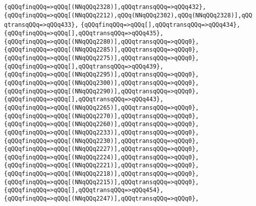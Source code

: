 \verb|{qQQqfinqQQq=>qQQq[(NNqQQq2328)],qQQqtransqQQq=>qQQq432},|\newline
\verb|{qQQqfinqQQq=>qQQq[(NNqQQq2212),qQQq(NNqQQq2302),qQQq(NNqQQq2328)],qQQqtransqQQq=>qQQq433},|\newline
\verb|{qQQqfinqQQq=>qQQq[],qQQqtransqQQq=>qQQq434},|\newline
\verb|{qQQqfinqQQq=>qQQq[],qQQqtransqQQq=>qQQq435},|\newline
\verb|{qQQqfinqQQq=>qQQq[(NNqQQq2280)],qQQqtransqQQq=>qQQq0},|\newline
\verb|{qQQqfinqQQq=>qQQq[(NNqQQq2285)],qQQqtransqQQq=>qQQq0},|\newline
\verb|{qQQqfinqQQq=>qQQq[(NNqQQq2275)],qQQqtransqQQq=>qQQq0},|\newline
\verb|{qQQqfinqQQq=>qQQq[],qQQqtransqQQq=>qQQq439},|\newline
\verb|{qQQqfinqQQq=>qQQq[(NNqQQq2295)],qQQqtransqQQq=>qQQq0},|\newline
\verb|{qQQqfinqQQq=>qQQq[(NNqQQq2300)],qQQqtransqQQq=>qQQq0},|\newline
\verb|{qQQqfinqQQq=>qQQq[(NNqQQq2290)],qQQqtransqQQq=>qQQq0},|\newline
\verb|{qQQqfinqQQq=>qQQq[],qQQqtransqQQq=>qQQq443},|\newline
\verb|{qQQqfinqQQq=>qQQq[(NNqQQq2265)],qQQqtransqQQq=>qQQq0},|\newline
\verb|{qQQqfinqQQq=>qQQq[(NNqQQq2270)],qQQqtransqQQq=>qQQq0},|\newline
\verb|{qQQqfinqQQq=>qQQq[(NNqQQq2260)],qQQqtransqQQq=>qQQq0},|\newline
\verb|{qQQqfinqQQq=>qQQq[(NNqQQq2233)],qQQqtransqQQq=>qQQq0},|\newline
\verb|{qQQqfinqQQq=>qQQq[(NNqQQq2230)],qQQqtransqQQq=>qQQq0},|\newline
\verb|{qQQqfinqQQq=>qQQq[(NNqQQq2227)],qQQqtransqQQq=>qQQq0},|\newline
\verb|{qQQqfinqQQq=>qQQq[(NNqQQq2224)],qQQqtransqQQq=>qQQq0},|\newline
\verb|{qQQqfinqQQq=>qQQq[(NNqQQq2221)],qQQqtransqQQq=>qQQq0},|\newline
\verb|{qQQqfinqQQq=>qQQq[(NNqQQq2218)],qQQqtransqQQq=>qQQq0},|\newline
\verb|{qQQqfinqQQq=>qQQq[(NNqQQq2215)],qQQqtransqQQq=>qQQq0},|\newline
\verb|{qQQqfinqQQq=>qQQq[],qQQqtransqQQq=>qQQq454},|\newline
\verb|{qQQqfinqQQq=>qQQq[(NNqQQq2247)],qQQqtransqQQq=>qQQq0},|\newline
